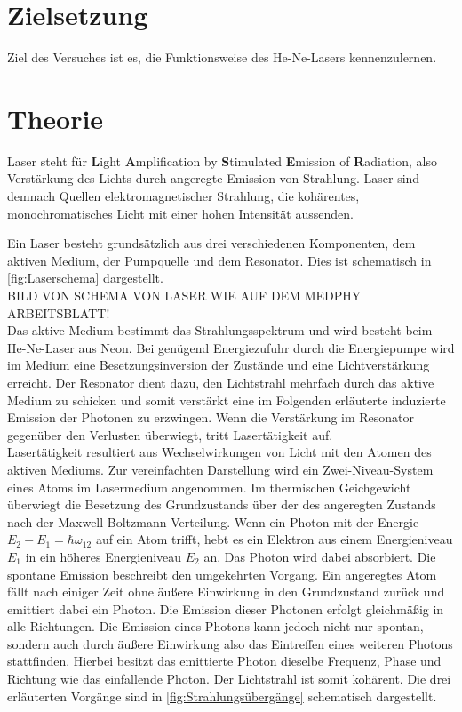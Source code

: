 \section{Zielsetzung}
\label{sec:Zielsetzung}
Ziel des Versuches ist es, die Funktionsweise des He-Ne-Lasers kennenzulernen.

\section{Theorie}
\label{sec:Theorie}

Laser steht für \textbf{L}ight \textbf{A}mplification by \textbf{S}timulated \textbf{E}mission of \textbf{R}adiation, also
Verstärkung des Lichts durch angeregte Emission von Strahlung.
Laser sind demnach Quellen elektromagnetischer Strahlung, die kohärentes, monochromatisches Licht mit einer hohen Intensität aussenden.

Ein Laser besteht grundsätzlich aus drei verschiedenen Komponenten, dem aktiven Medium, der Pumpquelle und dem Resonator.
Dies ist schematisch in \autoref{fig:Laserschema} dargestellt.\\

BILD VON SCHEMA VON LASER WIE AUF DEM MEDPHY ARBEITSBLATT!\\

Das aktive Medium bestimmt das Strahlungsspektrum und wird besteht beim He-Ne-Laser aus Neon.
Bei genügend Energiezufuhr durch die Energiepumpe wird im Medium eine Besetzungsinversion der Zustände und eine Lichtverstärkung erreicht.
Der Resonator dient dazu, den Lichtstrahl mehrfach durch das aktive Medium zu schicken und somit verstärkt eine im Folgenden erläuterte
induzierte Emission der Photonen zu erzwingen.
Wenn die Verstärkung im Resonator gegenüber den Verlusten überwiegt, tritt Lasertätigkeit auf.\\

Lasertätigkeit resultiert aus Wechselwirkungen von Licht mit den Atomen des aktiven Mediums.
Zur vereinfachten Darstellung wird ein Zwei-Niveau-System eines Atoms im Lasermedium angenommen.
Im thermischen Geichgewicht überwiegt die Besetzung des Grundzustands über der des angeregten Zustands nach der Maxwell-Boltzmann-Verteilung.
Wenn ein Photon mit der Energie $E_2-E_1 =\hbar \omega_{12}$ auf ein Atom trifft, hebt es ein Elektron aus einem Energieniveau $E_1$ in ein höheres
Energieniveau $E_2$ an. Das Photon wird dabei absorbiert.
Die spontane Emission beschreibt den umgekehrten Vorgang. Ein angeregtes Atom fällt nach einiger Zeit ohne äußere Einwirkung in den Grundzustand zurück
und emittiert dabei ein Photon. Die Emission dieser Photonen erfolgt gleichmäßig in alle Richtungen.
Die Emission eines Photons kann jedoch nicht nur spontan, sondern auch durch äußere Einwirkung also das Eintreffen eines weiteren Photons
stattfinden. Hierbei besitzt das emittierte Photon dieselbe Frequenz, Phase und Richtung wie das einfallende Photon.
Der Lichtstrahl ist somit kohärent.
Die drei erläuterten Vorgänge sind in \autoref{fig:Strahlungsübergänge} schematisch dargestellt.\\

